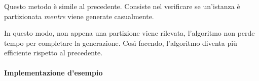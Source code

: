 \documentclass[../../../../relazione.tex]{subfiles}
\begin{document}
Questo metodo è simile al precedente.
Consiste nel verificare se un'istanza è partizionata \textit{mentre} viene generate casualmente.

In questo modo, non appena una partizione viene rilevata, l'algoritmo non perde tempo per completare la generazione.
Così facendo, l'algoritmo diventa più efficiente rispetto al precedente.

\paragraph{Implementazione d'esempio}

\end{document}

